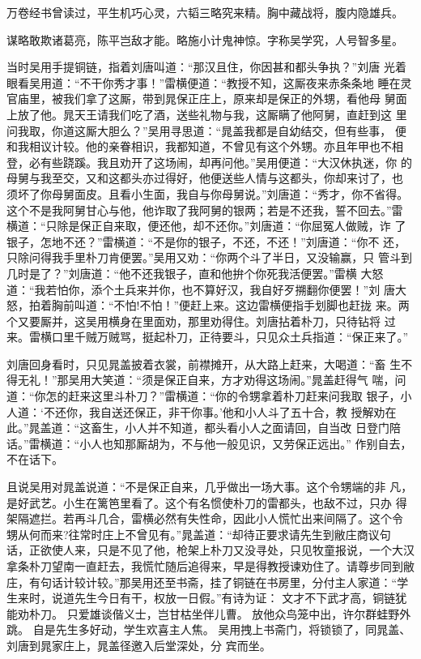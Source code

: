 万卷经书曾读过，平生机巧心灵，六韬三略究来精。胸中藏战将，腹内隐雄兵。

谋略敢欺诸葛亮，陈平岂敌才能。略施小计鬼神惊。字称吴学究，人号智多星。

当时吴用手提铜链，指着刘唐叫道：“那汉且住，你因甚和都头争执？”刘唐
光着眼看吴用道：“不干你秀才事！”雷横便道：“教授不知，这厮夜来赤条条地
睡在灵官庙里，被我们拿了这厮，带到晁保正庄上，原来却是保正的外甥，看他母
舅面上放了他。晁天王请我们吃了酒，送些礼物与我，这厮瞒了他阿舅，直赶到这
里问我取，你道这厮大胆么？”吴用寻思道：“晁盖我都是自幼结交，但有些事，
便和我相议计较。他的亲眷相识，我都知道，不曾见有这个外甥。亦且年甲也不相
登，必有些跷蹊。我且劝开了这场闹，却再问他。”吴用便道：“大汉休执迷，你
的母舅与我至交，又和这都头亦过得好，他便送些人情与这都头，你却来讨了，也
须坏了你母舅面皮。且看小生面，我自与你母舅说。”刘唐道：“秀才，你不省得。
这个不是我阿舅甘心与他，他诈取了我阿舅的银两；若是不还我，誓不回去。”雷
横道：“只除是保正自来取，便还他，却不还你。”刘唐道：“你屈冤人做贼，诈
了银子，怎地不还？”雷横道：“不是你的银子，不还，不还！”刘唐道：“你不
还，只除问得我手里朴刀肯便罢。”吴用又劝：“你两个斗了半日，又没输赢，只
管斗到几时是了？”刘唐道：“他不还我银子，直和他拚个你死我活便罢。”雷横
大怒道：“我若怕你，添个土兵来并你，也不算好汉，我自好歹搠翻你便罢！”刘
唐大怒，拍着胸前叫道：“不怕!不怕！”便赶上来。这边雷横便指手划脚也赶拢
来。两个又要厮并，这吴用横身在里面劝，那里劝得住。刘唐拈着朴刀，只待钻将
过来。雷横口里千贼万贼骂，挺起朴刀，正待要斗，只见众土兵指道：“保正来了。”

刘唐回身看时，只见晁盖披着衣裳，前襟摊开，从大路上赶来，大喝道：“畜
生不得无礼！”那吴用大笑道：“须是保正自来，方才劝得这场闹。”晁盖赶得气
喘，问道：“你怎的赶来这里斗朴刀？”雷横道：“你的令甥拿着朴刀赶来问我取
银子，小人道：‘不还你，我自送还保正，非干你事。’他和小人斗了五十合，教
授解劝在此。”晁盖道：“这畜生，小人并不知道，都头看小人之面请回，自当改
日登门陪话。”雷横道：“小人也知那厮胡为，不与他一般见识，又劳保正远出。”
作别自去，不在话下。

且说吴用对晁盖说道：“不是保正自来，几乎做出一场大事。这个令甥端的非
凡，是好武艺。小生在篱笆里看了。这个有名惯使朴刀的雷都头，也敌不过，只办
得架隔遮拦。若再斗几合，雷横必然有失性命，因此小人慌忙出来间隔了。这个令
甥从何而来?往常时庄上不曾见有。”晁盖道：“却待正要求请先生到敝庄商议句
话，正欲使人来，只是不见了他，枪架上朴刀又没寻处，只见牧童报说，一个大汉
拿条朴刀望南一直赶去，我慌忙随后追得来，早是得教授谏劝住了。请尊步同到敝
庄，有句话计较计较。”那吴用还至书斋，挂了铜链在书房里，分付主人家道：“学
生来时，说道先生今日有干，权放一日假。”有诗为证：
文才不下武才高，铜链犹能劝朴刀。
只爱雄谈偕义士，岂甘枯坐伴儿曹。
放他众鸟笼中出，许尔群蛙野外跳。
自是先生多好动，学生欢喜主人焦。
吴用拽上书斋门，将锁锁了，同晁盖、刘唐到晁家庄上，晁盖径邀入后堂深处，分
宾而坐。

